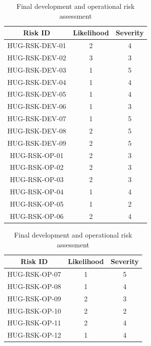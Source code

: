 \begin{table}[H]
    \centering
    \caption{Final development and operational risk assessment}
    \label{tab:risk_assessment_mitigated}

    \begin{minipage}{0.48\textwidth}
        \centering
        \begin{tabular}{|c|c|c|}
        \hline
        \textbf{Risk ID} & \textbf{Likelihood} & \textbf{Severity} \\ \hline \hline
        HUG-RSK-DEV-01 & 2 & 4 \\ \hline
        HUG-RSK-DEV-02 & 3 & 3 \\ \hline
        HUG-RSK-DEV-03 & 1 & 5 \\ \hline
        HUG-RSK-DEV-04 & 1 & 4 \\ \hline
        HUG-RSK-DEV-05 & 1 & 4 \\ \hline 
        HUG-RSK-DEV-06 & 1 & 3 \\ \hline
        HUG-RSK-DEV-07 & 1 & 5 \\ \hline
        HUG-RSK-DEV-08 & 2 & 5 \\ \hline
        HUG-RSK-DEV-09 & 2 & 5 \\ \hline
        HUG-RSK-OP-01  & 2 & 3 \\ \hline
        HUG-RSK-OP-02  & 2 & 3 \\ \hline
        HUG-RSK-OP-03  & 2 & 3 \\ \hline
        HUG-RSK-OP-04  & 1 & 4 \\ \hline
        HUG-RSK-OP-05  & 1 & 2 \\ \hline
        HUG-RSK-OP-06  & 2 & 4 \\ \hline
        \end{tabular}
    \end{minipage}
    \hfill
    \begin{minipage}{0.48\textwidth}
        \centering
        \begin{tabular}{|c|c|c|}
        \hline
        \textbf{Risk ID} & \textbf{Likelihood} & \textbf{Severity} \\ \hline \hline
        HUG-RSK-OP-07  & 1 & 5 \\ \hline
        HUG-RSK-OP-08  & 1 & 4 \\ \hline
        HUG-RSK-OP-09  & 2 & 3 \\ \hline
        HUG-RSK-OP-10  & 2 & 2 \\ \hline 
        HUG-RSK-OP-11  & 2 & 4 \\ \hline
        HUG-RSK-OP-12  & 1 & 4 \\ \hline

\end{tabular}
\end{minipage}
\end{table}
